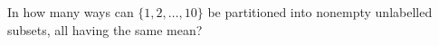 In how many ways can $\{1,2,\ldots,10\}$ be partitioned into nonempty unlabelled subsets, all having the same mean?
